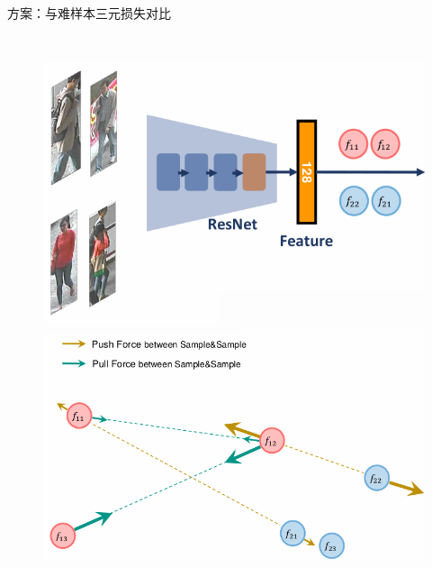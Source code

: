\documentclass[usenames,dvipsnames,notes]{beamer}
\begin{document}
\begin{frame}{方案：与难样本三元损失对比}
	\begin{columns}
		\begin{figure}
			\centering
			\includegraphics[width=\textwidth]{fig/over0.png}
			\includegraphics[width=\textwidth]{fig/illu0.png}
			\label{fig:dcent2}
		\end{figure}



\end{columns}
\end{frame}
\end{document}
